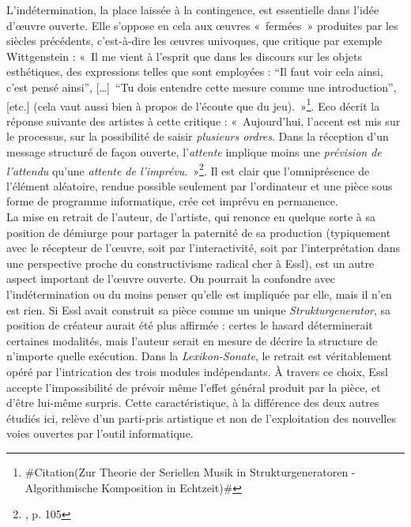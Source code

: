 \documentclass[a4paper,12pt]{article}
\newcommand{\guill}[1]{«~#1~»}
\newcommand{\guilldeux}[1]{“#1”}
\newcommand{\zitat}[2]{\#Citation(#2)\#}
\newcommand{\tpp}[0]{[\dots]}
\begin{document}
L'indétermination, la place laissée à la contingence, est essentielle dans l'idée d'œuvre ouverte. Elle s'oppose en cela aux œuvres \guill{fermées} produites par les siècles précédents, c'est-à-dire les œuvres univoques, que critique par exemple Wittgenstein : \guill{Il me vient à l'esprit que dans les discours sur les objets esthétiques, des expressions telles que  sont employées : \guilldeux{Il faut voir cela ainsi, c'est pensé ainsi}, \tpp~\guilldeux{Tu dois entendre cette mesure comme une introduction}, [etc.] (cela vaut aussi bien à propos de l'écoute que du jeu).}\footnote{\zitat{"Da fällt mir ein, daß in Gesprächen über ästhetische Gegenstände die Worte gebraucht werden: 'Du mußt es so sehen, so ist es gemeint'; 'Wenn du es so siehst, siehst Du, wo der Fehler liegt'; 'Du mußt diese Takte als Einleitung hören'; 'Du mußt nach dieser Tonart hinhören'; 'Du mußt es so phrasieren' (und das kann sich auf's Hören wie auf's Spielen beziehen)." [Ludwig Wittgenstein, Philosophische Untersuchungen, II/xi, S. 534]} {Zur Theorie der Seriellen Musik in Strukturgeneratoren - Algorithmische Komposition in Echtzeit}}. Eco décrit la réponse suivante des artistes à cette critique : \guill{Aujourd'hui, l'accent est mis sur le processus, sur la possibilité de saisir \emph{plusieurs ordres}. Dans la réception d'un message structuré de façon ouverte, l'\emph{attente} implique moins une \emph{prévision de l'attendu} qu'une \emph{attente de l'imprévu}.}\footnote{\cite{eco1962opera}, p. 105}. Il est clair que l'omniprésence de l'élément aléatoire, rendue possible seulement par l'ordinateur et une pièce sous forme de programme informatique, crée cet imprévu en permanence. \\
La mise en retrait de l'auteur, de l'artiste, qui renonce en quelque sorte à sa position de démiurge pour partager la paternité de sa production (typiquement avec le récepteur de l'œuvre, soit par l'interactivité, soit par l'interprétation dans une perspective proche du constructivisme radical cher à Essl), est un autre aspect important de l'œuvre ouverte. On pourrait la confondre avec l'indétermination ou du moins penser qu'elle est impliquée par elle, mais il n'en est rien. Si Essl avait construit sa pièce comme un unique \emph{Strukturgenerator}, sa position de créateur aurait été plus affirmée : certes le hasard déterminerait certaines modalités, mais l'auteur serait en mesure de décrire la structure de n'importe quelle exécution. Dans la \emph{Lexikon-Sonate}, le retrait est véritablement opéré par l'intrication des trois modules indépendants. À travers ce choix, Essl accepte l'impossibilité de prévoir même l'effet général produit par la pièce, et d'être lui-même surpris. Cette caractéristique, à la différence des deux autres étudiés ici, relève d'un parti-pris artistique et non de l'exploitation des nouvelles voies ouvertes par l'outil informatique. \\
\end{document}
